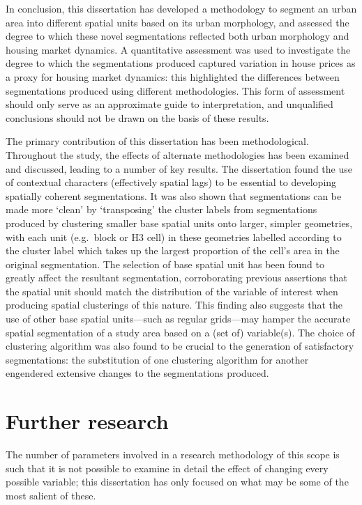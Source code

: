 \documentclass[a4paper, nobind]{templates/ociamthesis}
\begin{document}
In conclusion, this dissertation has developed a methodology to segment an urban area into different spatial units based on its urban morphology, and assessed the degree to which these novel segmentations reflected both urban morphology and housing market dynamics. A quantitative assessment was used to investigate the degree to which the segmentations produced captured variation in house prices as a proxy for housing market dynamics: this highlighted the differences between segmentations produced using different methodologies. This form of assessment should only serve as an approximate guide to interpretation, and unqualified conclusions should not be drawn on the basis of these results.

The primary contribution of this dissertation has been methodological. Throughout the study, the effects of alternate methodologies has been examined and discussed, leading to a number of key results. The dissertation found the use of contextual characters (effectively spatial lags) to be essential to developing spatially coherent segmentations. It was also shown that segmentations can be made more `clean' by `transposing' the cluster labels from segmentations produced by clustering smaller base spatial units onto larger, simpler geometries, with each unit (e.g.~block or H3 cell) in these geometries labelled according to the cluster label which takes up the largest proportion of the cell's area in the original segmentation. The selection of base spatial unit has been found to greatly affect the resultant segmentation, corroborating previous assertions that the spatial unit should match the distribution of the variable of interest when producing spatial clusterings of this nature. This finding also suggests that the use of other base spatial units---such as regular grids---may hamper the accurate spatial segmentation of a study area based on a (set of) variable(s). The choice of clustering algorithm was also found to be crucial to the generation of satisfactory segmentations: the substitution of one clustering algorithm for another engendered extensive changes to the segmentations produced.

\hypertarget{further-research}{%
\section{Further research}\label{further-research}}

The number of parameters involved in a research methodology of this scope is such that it is not possible to examine in detail the effect of changing every possible variable; this dissertation has only focused on what may be some of the most salient of these.
\end{document}
